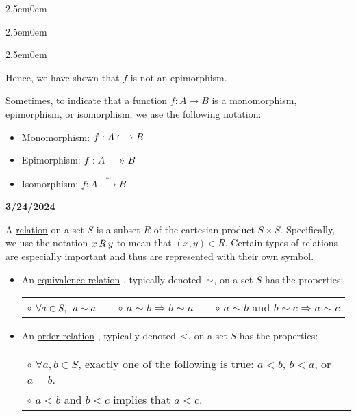 \documentclass{book}
\newcommand{\hooklongrightarrow}{\lhook\joinrel\longrightarrow}
\newcommand{\longrightarrowdbl}{\longrightarrow\mathrel{\mkern-14mu}\rightarrow}
\newenvironment{myIndent}{%
   \begin{adjustwidth}{2.5em}{0em}%
}{%
   \end{adjustwidth}%
}
\newcommand{\udefine}[1]{{%
   \setulcolor{Red}%
   \setul{0.14em}{0.07em}%
   \ul{#1}%
}}
\newcommand*{\markDate}[1]{%
   {\huge \color{Black} \textbf{#1} \newline}%
}
\newcommand{\myHS}{ \hspace{0.5em}}
\newcommand{\retTwo}{\hfill\bigbreak}
\begin{document}
\begin{myIndent}
\begin{myIndent}
\begin{myIndent}
            Hence, we have shown that $f$ is not an epimorphism.\retTwo
         \end{myIndent}
      \end{myIndent}
   \end{myIndent}

   Sometimes, to indicate that a function $f: A \rightarrow B$ is a monomorphism,\\ epimorphism, or isomorphism, we use the following notation:
   \begin{itemize}
      \item Monomorphism: $f: A \hooklongrightarrow B$
      \item Epimorphism: $f: A \longrightarrowdbl B$
      \item Isomorphism: $f: A \xrightarrow{\phantom{a}\sim\phantom{a}} B$
   \end{itemize}

   \newpage
   \markDate{3/24/2024}

   A \udefine{relation} on a set $S$ is a subset $R$ of the cartesian product $S \times S$. Specifically,\\ we use the notation $x \hspace{0.2em}R\hspace{0.2em} y$ to mean that $(x, y) \in R$. Certain types of relations\\ are especially important and thus are represented with their own symbol.
   \begin{itemize}
      \item An \udefine{equivalence relation}, typically denoted $\hspace{0.1em}\sim$, on a set $S$ has the properties:\\
      \begin{tabular}{l c l c l}
         $\circ$ $\forall a \in S,\myHS a \sim a$ &\quad& $\circ$ $a \sim b \Longrightarrow b \sim a$ &\quad& $\circ$ $a \sim b$ and $b \sim c \Longrightarrow a \sim c$
      \end{tabular}

      \item An \udefine{order relation}, typically denoted $\hspace{0.1em}<$, on a set $S$ has the properties:\\
      \begin{tabular}{l}
         $\circ$ $\forall a, b \in S$, exactly one of the following is true: $a < b$, $b < a$, or $a = b$.\\
         $\circ$ $a < b$ and $b < c$ implies that $a < c$.\retTwo
      \end{tabular}
   \end{itemize}
\end{document}
